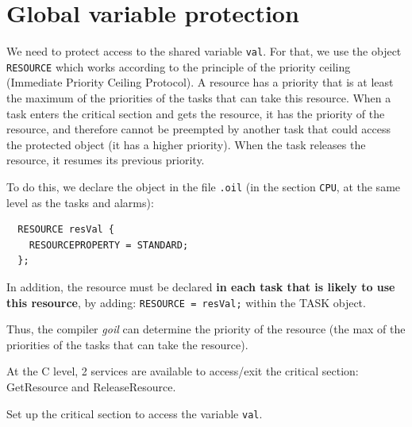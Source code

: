 \documentclass[11pt]{report}
\newcommand{\unixcl}[1]{\texttt{\fcolorbox{black}{gray!20}{\footnotesize#1}}}
\begin{document}
\section{Global variable protection}


We need to protect access to the shared variable \texttt{val}. For that, we use the object \texttt{RESOURCE} which works according to the principle of the priority ceiling (Immediate Priority Ceiling Protocol). A resource has a priority that is at least the maximum of the priorities of the tasks that can take this resource. When a task enters the critical section and gets the resource, it has the priority of the resource, and therefore cannot be preempted by another task that could access the protected object (it has a higher priority). When the task releases the resource, it resumes its previous priority. 

To do this, we declare the object in the file \texttt{.oil} (in the section \texttt{CPU}, at the same level as the tasks and alarms):

\begin{lstlisting}
  RESOURCE resVal {
    RESOURCEPROPERTY = STANDARD;
  };
\end{lstlisting}

In addition, the resource must be declared \textbf{in each task that is likely to use this resource}, by adding:
\lstinline{RESOURCE = resVal;}
within the TASK object.

Thus, the compiler \emph{goil} can determine the priority of the resource (the max of the priorities of the tasks that can take the resource).

At the C level, 2 services are available to access/exit the critical section: GetResource and ReleaseResource.

Set up the critical section to access the variable \texttt{val}. 
%
\end{document}
